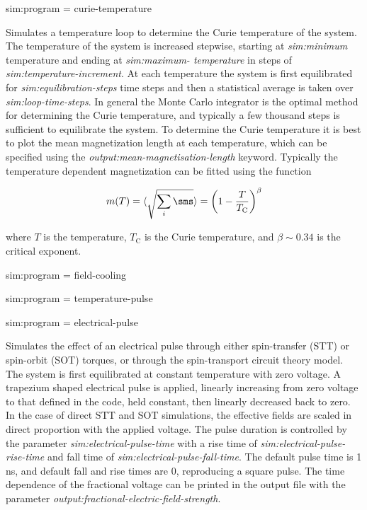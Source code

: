 {\zicf sim:program = curie-temperature} Simulates a temperature loop to determine the Curie temperature of the system. The temperature of the system is increased stepwise, starting at \textit{sim:minimum} temperature and ending at \textit{sim:maximum- temperature} in steps of \textit{sim:temperature-increment}. At each temperature the system is first equilibrated for \textit{sim:equilibration-steps} time steps and then a statistical average is taken over \textit{sim:loop-time-steps}. In general the Monte Carlo integrator is the optimal method for determining the Curie temperature, and typically a few thousand steps is sufficient to equilibrate the system. To determine the Curie temperature it is best to plot the mean magnetization length at each temperature, which can be specified using the \textit{output:mean-magnetisation-length} keyword. Typically the temperature dependent magnetization can be fitted using the function

\begin{equation}
m(T) = \langle{\sqrt{\sum_i \sms}}\rangle = \left(1 - \frac{T}{T_{\mathrm{C}}} \right)^{\beta}
\end{equation}

\noindent where $T$ is the temperature, $T_{\mathrm{C}}$ is the Curie temperature, and $\beta \sim 0.34$ is the critical exponent.

{\zicf sim:program = field-cooling}

{\zicf sim:program = temperature-pulse}

{\zicf sim:program = electrical-pulse}
Simulates the effect of an electrical pulse through either spin-transfer (STT) or
spin-orbit (SOT) torques, or through the spin-transport circuit theory model. The
system is first equilibrated at constant temperature with zero voltage. A
trapezium shaped electrical pulse is applied, linearly increasing from zero
voltage to that defined in the code, held constant, then linearly decreased back
to zero. In the case of direct STT and SOT simulations, the effective fields are
scaled in direct proportion with the applied voltage. The pulse duration is
controlled by the parameter \textit{sim:electrical-pulse-time}
with a rise time of \textit{sim:electrical-pulse-rise-time} and fall time of
\textit{sim:electrical-pulse-fall-time}. The default pulse time is 1 ns, and
default fall and rise times are 0, reproducing a square pulse. The time
dependence of the fractional voltage can be printed in the output file with the
parameter \textit{output:fractional-electric-field-strength}.

